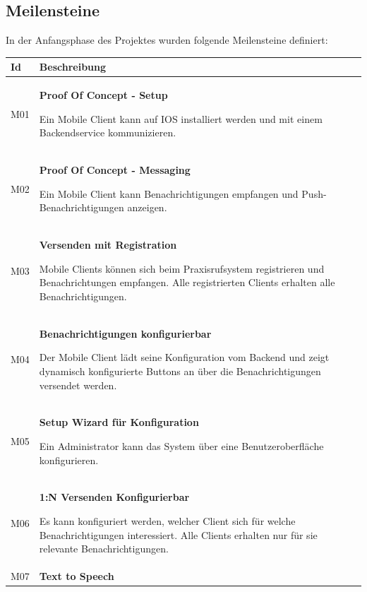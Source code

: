 \clearpage
\subsection{Meilensteine}

In der Anfangsphase des Projektes wurden folgende Meilensteine definiert:

\begin{table}[h]
    \centering
    \begin{tabular}{|l|p{15cm}|}
        \hline
        \textbf{Id} & \textbf{Beschreibung}                                                                                                                                                                                         \\
        \hline
        M01         & \textbf{Proof Of Concept - Setup}

        Ein Mobile Client kann auf IOS installiert werden und mit einem Backendservice kommunizieren. \\
        \hline
        M02         & \textbf{Proof Of Concept - Messaging}

        Ein Mobile Client kann Benachrichtigungen empfangen und Push-Benachrichtigungen anzeigen. \\
        \hline
        M03         & \textbf{Versenden mit Registration}

        Mobile Clients können sich beim Praxisrufsystem registrieren und Benachrichtungen empfangen. Alle registrierten Clients erhalten alle Benachrichtigungen. \\
        \hline
        M04         & \textbf{Benachrichtigungen konfigurierbar}

        Der Mobile Client lädt seine Konfiguration vom Backend und zeigt dynamisch konfigurierte Buttons an über die Benachrichtigungen versendet werden.\\
        \hline
        M05         & \textbf{Setup Wizard für Konfiguration}

        Ein Administrator kann das System über eine Benutzeroberfläche konfigurieren. \\
        \hline
        M06         & \textbf{1:N Versenden Konfigurierbar}

        Es kann konfiguriert werden, welcher Client sich für welche Benachrichtigungen interessiert. Alle Clients erhalten nur für sie relevante Benachrichtigungen.  \\
        \hline
        M07         & \textbf{Text to Speech}


\end{tabular}
\end{table}
